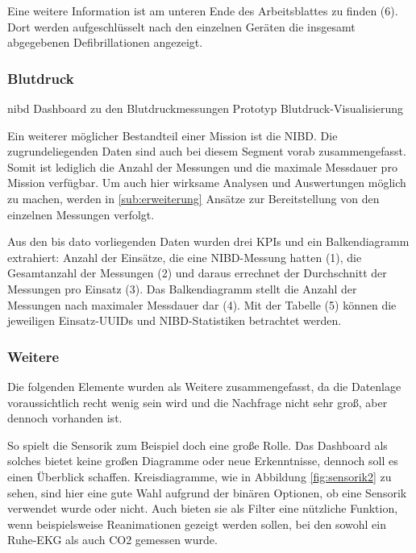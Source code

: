 Eine weitere Information ist am unteren Ende des Arbeitsblattes zu finden (6).
Dort werden aufgeschlüsselt nach den einzelnen Geräten die insgesamt abgegebenen Defibrillationen angezeigt.

\subsubsection{Blutdruck}
\label{subsub:nibd}
\bildbreit
{nibd}
{Dashboard zu den Blutdruckmessungen}
{Prototyp Blutdruck-Visualisierung}

Ein weiterer möglicher Bestandteil einer Mission ist die \gls{NIBD}.
Die zugrundeliegenden Daten sind auch bei diesem Segment vorab zusammengefasst.
Somit ist lediglich die Anzahl der Messungen und die maximale Messdauer pro Mission verfügbar.
Um auch hier wirksame Analysen und Auswertungen möglich zu machen, werden in \ref{sub:erweiterung} Ansätze zur Bereitstellung von den einzelnen Messungen verfolgt.

Aus den bis dato vorliegenden Daten wurden drei \gls{KPI}s und ein Balkendiagramm extrahiert:
Anzahl der Einsätze, die eine \gls{NIBD}-Messung hatten (1), die Gesamtanzahl der Messungen (2) und daraus errechnet der Durchschnitt der Messungen pro Einsatz (3).
Das Balkendiagramm stellt die Anzahl der Messungen nach maximaler Messdauer dar (4).
Mit der Tabelle (5) können die jeweiligen Einsatz-UUIDs und \gls{NIBD}-Statistiken betrachtet werden. 



\subsubsection{Weitere}
\label{subsub:weitere}
Die folgenden Elemente wurden als \glqq Weitere\grqq{} zusammengefasst, da die Datenlage voraussichtlich recht wenig sein wird und die Nachfrage nicht sehr groß, aber dennoch vorhanden ist.


So spielt die Sensorik zum Beispiel doch eine große Rolle. 
Das Dashboard als solches bietet keine großen Diagramme oder neue Erkenntnisse, dennoch soll es einen Überblick schaffen.
Kreisdiagramme, wie in Abbildung \ref{fig:sensorik2} zu sehen, sind hier eine gute Wahl aufgrund der binären Optionen, ob eine Sensorik verwendet wurde oder nicht.
Auch bieten sie als Filter eine nützliche Funktion, wenn beispielsweise Reanimationen gezeigt werden sollen, bei den sowohl ein Ruhe-EKG als auch CO2 gemessen wurde.

